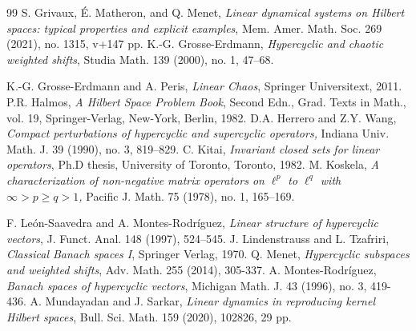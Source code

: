 \documentclass[12pt, reqno]{amsart}
\theoremstyle{definition}
\theoremstyle{remark}
\numberwithin{equation}{section}
\begin{document}
\begin{thebibliography}{99}
 S. Grivaux, \'{E}. Matheron, and Q. Menet, \textit {Linear dynamical systems on Hilbert spaces: typical properties and explicit examples}, Mem. Amer. Math. Soc. 269 (2021), no. 1315, v+147 pp.
 K.-G. Grosse-Erdmann, \emph{Hypercyclic and chaotic weighted shifts}, Studia Math. 139 (2000), no. 1, 47–68.

 K.-G. Grosse-Erdmann and A. Peris, \emph{Linear Chaos}, Springer Universitext,
2011.
 P.R. Halmos, \textit{A Hilbert Space Problem Book}, Second Edn., Grad. Texts in Math., vol. 19, Springer-Verlag, New-York, Berlin, 1982. 
D.A. Herrero and Z.Y. Wang, \textit{Compact perturbations of hypercyclic and supercyclic operators,}
Indiana Univ. Math. J. 39 (1990), no. 3, 819–829.
 C. Kitai, \textit{Invariant closed sets for linear operators}, Ph.D thesis, University of Toronto, Toronto, 1982.
 M. Koskela, \textit{A characterization of non-negative matrix operators on $\ell^{p}$ to $\ell^{q}$ with $\infty>p\geq q>1$,} Pacific J. Math. 75 (1978), no. 1, 165–169.

 F. Le\'{o}n-Saavedra and A. Montes-Rodr\'{i}guez, \textit{Linear structure of hypercyclic vectors}, J. Funct. Anal. 148 (1997), 524–545.
 J. Lindenstrauss and L. Tzafriri, \textit{Classical Banach spaces I}, Springer Verlag, 1970.
 Q. Menet, \textit{Hypercyclic subspaces and weighted shifts}, Adv. Math. 255 (2014), 305-337.
 A. Montes-Rodr\'{i}guez, \textit{Banach spaces of hypercyclic vectors}, Michigan Math. J. 43 (1996), no. 3, 419-436.
 A. Mundayadan and J. Sarkar, \textit{Linear dynamics in reproducing kernel Hilbert spaces}, Bull. Sci. Math. 159 (2020), 102826, 29 pp.


\end{thebibliography}
\end{document}
